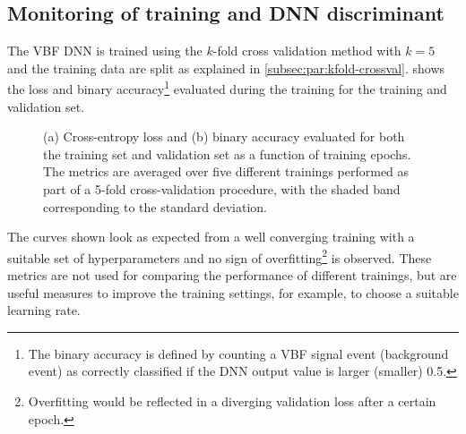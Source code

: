 \subsection{Monitoring of training and DNN discriminant}
\label{subsec:performance-metrics}
The VBF DNN is trained using the $k$-fold cross validation method with $k=5$ and the training data are split as explained in \cref{subsec:par:kfold-crossval}.
 shows the loss and binary accuracy\footnote{The binary accuracy is defined by counting a VBF signal event (background event) as correctly classified if the DNN output value is larger (smaller) 0.5.
} evaluated during the training for the training and validation set.
\begin{figure}[ht]
    \caption[Loss and accuracy for the training and validation set as a function of training epochs.]{(a) Cross-entropy loss and (b) binary accuracy evaluated for both the training set and validation set as a function of training epochs. The metrics are averaged over five different trainings performed as part of a 5-fold cross-validation procedure, with the shaded band corresponding to the standard deviation.}
    \label{fig:monitoring}
\end{figure}
The curves shown look as expected from a well converging training with a suitable set of hyperparameters and no sign of overfitting\footnote{Overfitting would be reflected in a diverging validation loss after a certain epoch.} is observed. These metrics are not used for comparing the performance of different trainings, but are useful measures to improve the training settings, for example, to choose a suitable learning rate.  

